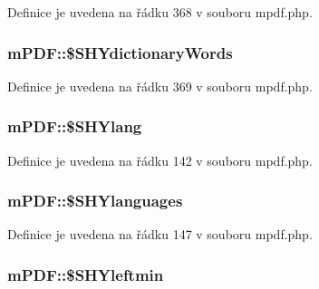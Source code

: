 Definice je uvedena na řádku 368 v souboru mpdf.\-php.

\hypertarget{classm_p_d_f_a118a9e4ed49ccf4b242f37aa7bab5824}{
\subsubsection[{\$\-S\-H\-Ydictionary\-Words}]{\setlength{\rightskip}{0pt plus 5cm}m\-P\-D\-F\-::\$\-S\-H\-Ydictionary\-Words}}\label{classm_p_d_f_a118a9e4ed49ccf4b242f37aa7bab5824}


Definice je uvedena na řádku 369 v souboru mpdf.\-php.

\hypertarget{classm_p_d_f_a9584da269bc9ba4c0c08536ef71f11cd}{
\subsubsection[{\$\-S\-H\-Ylang}]{\setlength{\rightskip}{0pt plus 5cm}m\-P\-D\-F\-::\$\-S\-H\-Ylang}}\label{classm_p_d_f_a9584da269bc9ba4c0c08536ef71f11cd}


Definice je uvedena na řádku 142 v souboru mpdf.\-php.

\hypertarget{classm_p_d_f_a062911bd6b95bf03618486410d216d83}{
\subsubsection[{\$\-S\-H\-Ylanguages}]{\setlength{\rightskip}{0pt plus 5cm}m\-P\-D\-F\-::\$\-S\-H\-Ylanguages}}\label{classm_p_d_f_a062911bd6b95bf03618486410d216d83}


Definice je uvedena na řádku 147 v souboru mpdf.\-php.

\hypertarget{classm_p_d_f_aa24fb1cb827020fe133be5226ab81e8a}{
\subsubsection[{\$\-S\-H\-Yleftmin}]{\setlength{\rightskip}{0pt plus 5cm}m\-P\-D\-F\-::\$\-S\-H\-Yleftmin}}\label{classm_p_d_f_aa24fb1cb827020fe133be5226ab81e8a}


